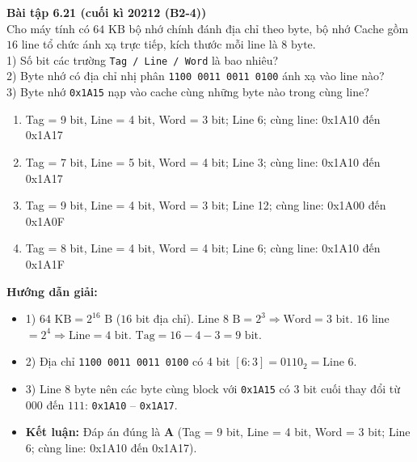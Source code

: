 \textbf{Bài tập 6.21 (cuối kì 20212 (B2-4))}\\
Cho máy tính có $64\text{ KB}$ bộ nhớ chính đánh địa chỉ theo byte, bộ nhớ Cache gồm $16$ line tổ chức ánh xạ trực tiếp, kích thước mỗi line là $8\text{ byte}$.\\
1) Số bit các trường \texttt{Tag / Line / Word} là bao nhiêu?\\
2) Byte nhớ có địa chỉ nhị phân \texttt{1100 0011 0011 0100} ánh xạ vào line nào?\\
3) Byte nhớ \texttt{0x1A15} nạp vào cache cùng những byte nào trong cùng line?
\begin{enumerate}[label=\Alph*.]
    \item Tag = 9 bit, Line = 4 bit, Word = 3 bit; Line 6; cùng line: 0x1A10 đến 0x1A17
    \item Tag = 7 bit, Line = 5 bit, Word = 4 bit; Line 3; cùng line: 0x1A10 đến 0x1A17
    \item Tag = 9 bit, Line = 4 bit, Word = 3 bit; Line 12; cùng line: 0x1A00 đến 0x1A0F
    \item Tag = 8 bit, Line = 4 bit, Word = 4 bit; Line 6; cùng line: 0x1A10 đến 0x1A1F
\end{enumerate}
\textbf{Hướng dẫn giải:}
\begin{itemize}
    \item 1) $64\text{ KB} = 2^{16}\text{ B}$ ($16$ bit địa chỉ). Line $8\text{ B} = 2^3 \Rightarrow \text{Word} = 3\text{ bit}$. $16$ line $= 2^4 \Rightarrow \text{Line} = 4\text{ bit}$. $\text{Tag} = 16 - 4 - 3 = 9\text{ bit}$.
    \item 2) Địa chỉ \texttt{1100 0011 0011 0100} có 4 bit $[6:3] = 0110_2 = \text{Line } 6$.
    \item 3) Line $8\text{ byte}$ nên các byte cùng block với \texttt{0x1A15} có 3 bit cuối thay đổi từ $000$ đến $111$: \texttt{0x1A10} -- \texttt{0x1A17}.
    \item \textbf{Kết luận:} Đáp án đúng là \textbf{A} (Tag = 9 bit, Line = 4 bit, Word = 3 bit; Line 6; cùng line: 0x1A10 đến 0x1A17).
\end{itemize}

